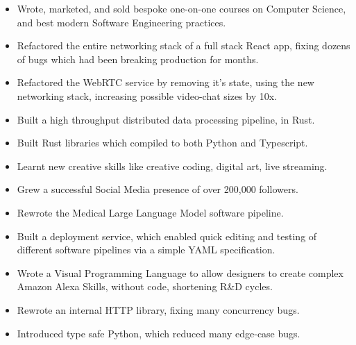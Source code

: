 \documentclass{jcgcv}
\begin{document}
\begin{column}
  \begin{itemize}
    \item Wrote, marketed, and sold bespoke one-on-one courses on Computer
          Science, and best modern Software Engineering practices.
  \end{itemize}

  \begin{itemize}
    \item Refactored the entire networking stack of a full stack React app, fixing
          dozens of bugs which had been breaking production for months.
    \item Refactored the WebRTC service by removing it's state, using the new
          networking stack, increasing possible video-chat sizes by 10x.
    \item Built a high throughput distributed data processing pipeline, in Rust.
    \item Built Rust libraries which compiled to both Python and Typescript.
  \end{itemize}

  \begin{itemize}
    \item Learnt new creative skills like creative coding, digital art, live streaming.
    \item Grew a successful Social Media presence of over 200,000 followers.
  \end{itemize}

  \begin{itemize}
    \item Rewrote the Medical Large Language Model software pipeline.
    \item Built a deployment service, which enabled quick editing and testing of
          different software pipelines via a simple YAML specification.
    \item Wrote a Visual Programming Language to allow designers to create
          complex Amazon Alexa Skills, without code, shortening R\&D cycles.
    \item Rewrote an internal HTTP library, fixing many concurrency bugs.
    \item Introduced type safe Python, which reduced many edge-case bugs.
  \end{itemize}


\end{column}
\end{document}
